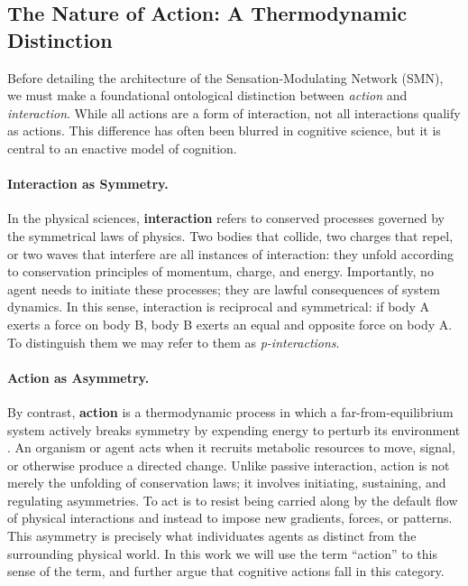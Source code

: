 \subsection{The Nature of Action: A Thermodynamic Distinction}
\label{subsec:action_nature}

Before detailing the architecture of the Sensation-Modulating Network (SMN), we must make a foundational ontological distinction between \textit{action} and \textit{interaction}. While all actions are a form of interaction, not all interactions qualify as actions. This difference has often been blurred in cognitive science, but it is central to an enactive model of cognition.

\paragraph{Interaction as Symmetry.}  
In the physical sciences, \textbf{interaction} refers to conserved processes governed by the symmetrical laws of physics. Two bodies that collide, two charges that repel, or two waves that interfere are all instances of interaction: they unfold according to conservation principles of momentum, charge, and energy. Importantly, no agent needs to initiate these processes; they are lawful consequences of system dynamics. In this sense, interaction is reciprocal and symmetrical: if body A exerts a force on body B, body B exerts an equal and opposite force on body A. To distinguish them we may refer to them as \textit{p-interactions}.

\paragraph{Action as Asymmetry.}  
By contrast, \textbf{action} is a thermodynamic process in which a far-from-equilibrium system actively breaks symmetry by expending energy to perturb its environment \cite{prigogine2018order}. An organism or agent acts when it recruits metabolic resources to move, signal, or otherwise produce a directed change. Unlike passive interaction, action is not merely the unfolding of conservation laws; it involves initiating, sustaining, and regulating asymmetries. To act is to resist being carried along by the default flow of physical interactions and instead to impose new gradients, forces, or patterns. This asymmetry is precisely what individuates agents as distinct from the surrounding physical world. In this work we will use the term ``action'' to this sense of the term, and further argue that cognitive actions fall in this category.

